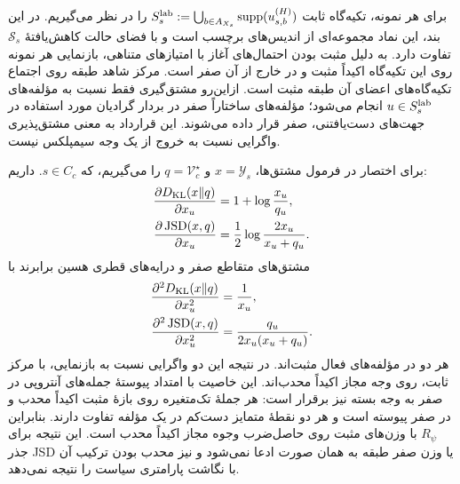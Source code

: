 برای هر نمونه، تکیه‌گاه ثابت $S_s^{\rm lab}:=\bigcup_{b\in A_{X_s}}\operatorname{supp}(u_{s,b}^{(H)})$ را در نظر می‌گیریم. در این بند، این نماد مجموعه‌ای از اندیس‌های برچسب است و با فضای حالت کاهش‌یافتهٔ $\mathcal S_s$ تفاوت دارد. به دلیل مثبت بودن احتمال‌های آغاز با امتیازهای متناهی، بازنمایی هر نمونه روی این تکیه‌گاه اکیداً مثبت و در خارج از آن صفر است. مرکز شاهد طبقه روی اجتماع تکیه‌گاه‌های اعضای آن طبقه مثبت است. ازاین‌رو مشتق‌گیری فقط نسبت به مؤلفه‌های $u\in S_s^{\rm lab}$ انجام می‌شود؛ مؤلفه‌های ساختاراً صفر در بردار گرادیان مورد استفاده در جهت‌های دست‌یافتنی، صفر قرار داده می‌شوند. این قرارداد به معنی مشتق‌پذیری واگرایی نسبت به خروج از یک وجه سیمپلکس نیست.

برای اختصار در فرمول مشتق‌ها، $x=\mathscr Y_s$ و $q=\mathcal V_c^\star$ را می‌گیریم، که $s\in C_c$. داریم:
\begin{equation}\label{cmp:eq:ch3-geometry-R-coordinate-gradient}
\begin{aligned}
\frac{\partial D_{\rm KL}(x\|q)}{\partial x_u}
&=1+\log\frac{x_u}{q_u},\\
\frac{\partial\operatorname{JSD}(x,q)}{\partial x_u}
&=\frac12\log\frac{2x_u}{x_u+q_u}.
\end{aligned}
\end{equation}
مشتق‌های متقاطع صفر و درایه‌های قطری هسین برابرند با
\begin{equation}\label{cmp:eq:ch3-geometry-R-coordinate-hessian}
\begin{aligned}
\frac{\partial^2 D_{\rm KL}(x\|q)}{\partial x_u^2}
&=\frac1{x_u},\\
\frac{\partial^2\operatorname{JSD}(x,q)}{\partial x_u^2}
&=\frac{q_u}{2x_u(x_u+q_u)}.
\end{aligned}
\end{equation}
هر دو در مؤلفه‌های فعال مثبت‌اند. در نتیجه این دو واگرایی نسبت به بازنمایی، با مرکز ثابت، روی وجه مجاز اکیداً محدب‌اند. این خاصیت با امتداد پیوستهٔ جمله‌های آنتروپی در صفر به وجه بسته نیز برقرار است: هر جملهٔ تک‌متغیره روی بازهٔ مثبت اکیداً محدب و در صفر پیوسته است و هر دو نقطهٔ متمایز دست‌کم در یک مؤلفه تفاوت دارند. بنابراین $R_\psi$ با وزن‌های مثبت روی حاصل‌ضرب وجوه مجاز اکیداً محدب است. این نتیجه برای جذر JSD یا وزن صفر طبقه به همان صورت ادعا نمی‌شود و نیز محدب بودن ترکیب آن با نگاشت پارامتری سیاست را نتیجه نمی‌دهد.

